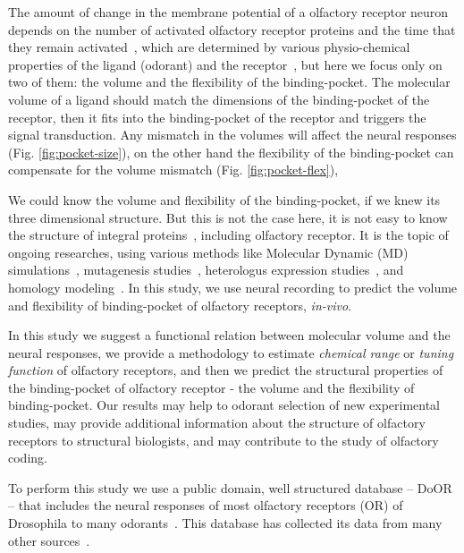 \documentclass[11pt]{paper} %
\begin{document}
The amount of change in the membrane potential of a olfactory receptor neuron depends on the number of activated olfactory receptor proteins and the time that they remain activated~\cite{},
which are determined by various physio-chemical properties of the ligand (odorant) and the receptor~\cite{}, 
but here we focus only on two of them: the volume and the flexibility of the binding-pocket.
The molecular volume of a ligand should match the dimensions of the binding-pocket of the receptor,
then it fits into the binding-pocket of the receptor and triggers the signal transduction. 
Any mismatch in the volumes will affect the neural responses (Fig. \ref{fig:pocket-size}), 
on the other hand the flexibility of the binding-pocket can compensate for the volume mismatch (Fig. \ref{fig:pocket-flex}),

We could know the volume and flexibility of the binding-pocket, if we knew its three dimensional structure.
But this is not the case here, it is not easy to know the structure of integral proteins~\cite{}, 
including olfactory receptor. It is the topic of ongoing researches, 
using various methods like Molecular Dynamic (MD) simulations~\cite{Khafizov2007,Lupieri2009}, 
mutagenesis studies~\cite{}, heterologus expression studies~\cite{}, and homology modeling~\cite{}.
In this study, we use neural recording to predict the volume and flexibility of binding-pocket of olfactory receptors, {\it in-vivo}.

In this study we suggest a functional relation between molecular volume and the neural responses, 
we provide a methodology to estimate {\it chemical range} or {\it tuning function} of olfactory receptors,
and then we predict the structural properties of the binding-pocket of olfactory receptor - the volume and the flexibility of binding-pocket.
Our results may help to odorant selection  of new experimental studies, 
may provide additional information about the structure of olfactory receptors to structural biologists, 
and may contribute to the study of olfactory coding.

To perform this study we use a public domain, well structured database -- DoOR -- 
that includes the neural responses of most olfactory receptors (OR) of Drosophila to many odorants~\cite{Galizia2010}. 
This database has collected its data from many other sources~\cite{Bruyne1999,Bruyne2001,Dobritsa2003,Goldman2005,Hallem2004,Hallem2006,
Kreher2005,Kreher2008,Kwon2007,Pelz2006,Pelz2006,Schmuker2007,Stensmyr2003,
Turner2009,VanderGoesvanNaters2007,Yao2005}.
\end{document}

